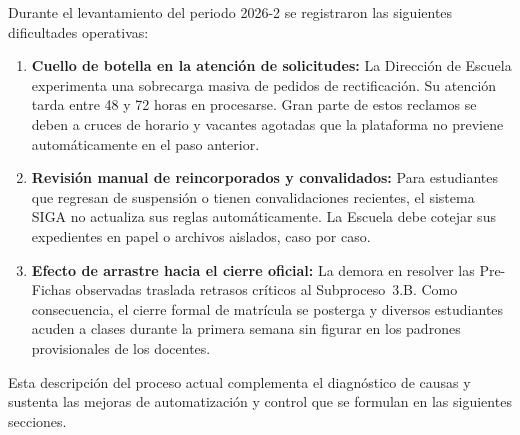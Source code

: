 Durante el levantamiento del periodo 2026-2 se registraron las siguientes dificultades operativas:
\begin{enumerate}
    \item \textbf{Cuello de botella en la atenci\'on de solicitudes:} La Direcci\'on de Escuela experimenta una sobrecarga masiva de pedidos de rectificaci\'on. Su atenci\'on tarda entre 48 y 72 horas en procesarse. Gran parte de estos reclamos se deben a cruces de horario y vacantes agotadas que la plataforma no previene autom\'aticamente en el paso anterior.
    \item \textbf{Revisi\'on manual de reincorporados y convalidados:} Para estudiantes que regresan de suspensi\'on o tienen convalidaciones recientes, el sistema SIGA no actualiza sus reglas autom\'aticamente. La Escuela debe cotejar sus expedientes en papel o archivos aislados, caso por caso.
    \item \textbf{Efecto de arrastre hacia el cierre oficial:} La demora en resolver las Pre-Fichas observadas traslada retrasos cr\'iticos al Subproceso~3.B. Como consecuencia, el cierre formal de matr\'icula se posterga y diversos estudiantes acuden a clases durante la primera semana sin figurar en los padrones provisionales de los docentes.
\end{enumerate}

Esta descripci\'on del proceso actual complementa el diagn\'ostico de causas y sustenta las mejoras de automatizaci\'on y control que se formulan en las siguientes secciones.
